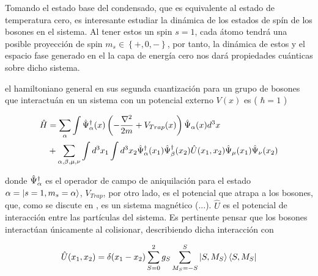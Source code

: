
Tomando el estado base del condensado, que es equivalente al estado de temperatura cero, es interesante estudiar la dinámica de los estados de spín de los bosones en el sistema. Al tener estos un spin $s = 1$, cada átomo tendrá una posible proyección de spin $m_s \in \left\lbrace +,0,- \right\rbrace$, por tanto, la dinámica de estos y el espacio fase generado en el la capa de energía cero nos dará propiedades cuánticas sobre dicho sistema. 

el hamiltoniano general en sus segunda cuantización para un grupo de bosones que interactuán en un sistema con un potencial externo $V(x)$ es ( $ \hbar = 1$ )

\begin{equation}
\begin{split}
\hat{H} & = \sum_{\alpha} \int \hat{\Psi}^{\dagger}_\alpha(x) \left( -\frac{\nabla^2}{2m} + V_{Trap}(x) \right) \hat{\Psi}_{\alpha}(x) d^3x \\ 
& + \sum_{\alpha,\beta, \mu, \nu} \int d^3x_1 \int d^3x_2  	\hat{\Psi}^{\dagger}_\alpha(x_1) \hat{\Psi}^{\dagger}_\beta(x_2) \hat{U}(x_1,x_2) \hat{\Psi}_{\mu}(x_1) \hat{\Psi}_{\nu}(x_2)
\end{split}
\label{gen_ham}
\end{equation}


donde $\hat{\Psi}^{\dagger}_\alpha$ es el operador de campo de aniquilación para el estado $\alpha = \left|s=1,m_s=\alpha\right\rangle$, $V_{Trap}$, por otro lado, es el potencial que atrapa a los bosones, que, como se discute en \cite{trap}, es un sistema magnético (...).
$\hat{U}$ es el potencial de interacción entre las partículas del sistema. Es pertinente pensar que los bosones interactúan únicamente al colisionar, describiendo dicha interacción con

\begin{equation}
\hat{U}(x_1,x_2) = \delta{(x_1 - x_2)} \sum_{S=0}^2 g_S \sum_{M_S=-S}^S \left|S,M_S\right\rangle\left\langle S,M_S\right|
\label{pseudopot}
\end{equation}


